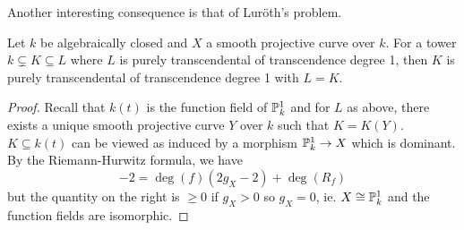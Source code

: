 Another interesting consequence is that of Lur\"{o}th's problem. 
\begin{corollary}\label{corr: Luroth problem}
    Let $k$ be algebraically closed and $X$ a smooth projective curve over $k$. For a tower $k\subsetneq K\subseteq L$ where $L$ is purely transcendental of transcendence degree 1, then $K$ is purely transcendental of transcendence degree 1 with $L=K$. 
\end{corollary}
\begin{proof}
    Recall that $k(t)$ is the function field of $\mathbb{P}^{1}_{k}$ and for $L$ as above, there exists a unique smooth projective curve $Y$ over $k$ such that $K=K(Y)$. $K\subseteq k(t)$ can be viewed as induced by a morphism $\mathbb{P}^{1}_{k}\to X$ which is dominant. By the Riemann-Hurwitz formula, we have 
    $$-2=\deg(f)(2g_{X}-2)+\deg(R_{f})$$
    but the quantity on the right is $\geq0$ if $g_{X}>0$ so $g_{X}=0$, ie. $X\cong\mathbb{P}^{1}_{k}$ and the function fields are isomorphic. 
\end{proof}